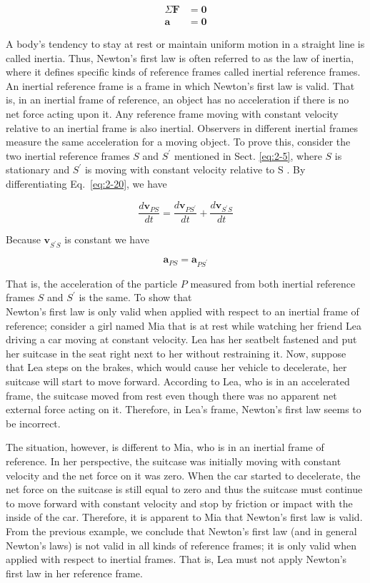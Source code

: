 \documentclass[10pt]{article}
\numberwithin{equation}{section}
\begin{document}
$$
\begin{aligned}
\Sigma \mathbf{F} & =\mathbf{0} \\
\mathbf{a} & =\mathbf{0}
\end{aligned}
$$

A body's tendency to stay at rest or maintain uniform motion in a straight line is called inertia. Thus, Newton's first law is often referred to as the law of inertia, where it defines specific kinds of reference frames called inertial reference frames. An inertial reference frame is a frame in which Newton's first law is valid. That is, in an inertial frame of reference, an object has no acceleration if there is no net force acting upon it. Any reference frame moving with constant velocity relative to an inertial frame is also inertial. Observers in different inertial frames measure the same acceleration for a moving object. To prove this, consider the two inertial reference frames $S$ and $S^{\prime}$ mentioned in Sect. \eqref{eq:2-5}, where $S$ is stationary and $S^{\prime}$ is moving with constant velocity relative to S . By differentiating Eq.~\eqref{eq:2-20}, we have

$$
\frac{d \mathbf{v}_{P S}}{d t}=\frac{d \mathbf{v}_{P S^{\prime}}}{d t}+\frac{d \mathbf{v}_{S^{\prime} S}}{d t}
$$

Because $\mathbf{v}_{S^{\prime} S}$ is constant we have

$$
\mathbf{a}_{P S}=\mathbf{a}_{P S^{\prime}}
$$

That is, the acceleration of the particle $P$ measured from both inertial reference frames $S$ and $S^{\prime}$ is the same. To show that\\
Newton's first law is only valid when applied with respect to an inertial frame of reference; consider a girl named Mia that is at rest while watching her friend Lea driving a car moving at constant velocity. Lea has her seatbelt fastened and put her suitcase in the seat right next to her without restraining it. Now, suppose that Lea steps on the brakes, which would cause her vehicle to decelerate, her suitcase will start to move forward. According to Lea, who is in an accelerated frame, the suitcase moved from rest even though there was no apparent net external force acting on it. Therefore, in Lea's frame, Newton's first law seems to be incorrect.

The situation, however, is different to Mia, who is in an inertial frame of reference. In her perspective, the suitcase was initially moving with constant velocity and the net force on it was zero. When the car started to decelerate, the net force on the suitcase is still equal to zero and thus the suitcase must continue to move forward with constant velocity and stop by friction or impact with the inside of the car. Therefore, it is apparent to Mia that Newton's first law is valid. From the previous example, we conclude that Newton's first law (and in general Newton's laws) is not valid in all kinds of reference frames; it is only valid when applied with respect to inertial frames. That is, Lea must not apply Newton's first law in her reference frame.
\end{document}
